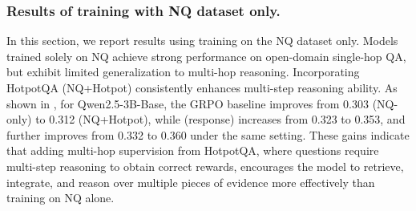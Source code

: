 \subsubsection{Results of training with NQ dataset only.}
In this section, we report results using training on the NQ dataset only. Models trained solely on NQ achieve strong performance on open-domain single-hop QA, but exhibit limited generalization to multi-hop reasoning. Incorporating HotpotQA (NQ+Hotpot) consistently enhances multi-step reasoning ability. As shown in , for Qwen2.5-3B-Base, the GRPO baseline improves from 0.303 (NQ-only) to 0.312 (NQ+Hotpot), while \ours{} (response) increases from 0.323 to 0.353, and \ours{} further improves from 0.332 to 0.360 under the same setting. These gains indicate that adding multi-hop supervision from HotpotQA, where questions require multi-step reasoning to obtain correct rewards, encourages the model to retrieve, integrate, and reason over multiple pieces of evidence more effectively than training on NQ alone.



